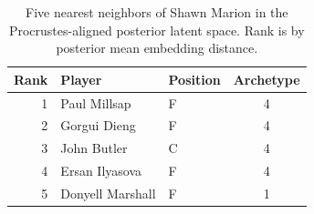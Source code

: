 \begin{table}[htbp]
  \centering\small
  \begin{tabular}{rllc}
    \toprule
    Rank & Player & Position & Archetype \\
    \midrule
    1 & Paul Millsap & F & 4 \\
    2 & Gorgui Dieng & F & 4 \\
    3 & John Butler & C & 4 \\
    4 & Ersan Ilyasova & F & 4 \\
    5 & Donyell Marshall & F & 1 \\
    \bottomrule
  \end{tabular}
  \caption{Five nearest neighbors of Shawn Marion in the Procrustes-aligned posterior latent space. Rank is by posterior mean embedding distance.}
  \label{tab:Shawn_Marion_neighbors}
\end{table}

